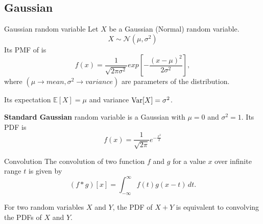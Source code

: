 \subsection{Gaussian}

\begin{fact}{Gaussian random variable}{}
  Let $X$ be a Gaussian (Normal) random variable.
  \begin{equation*}
      X \sim \mathcal{N}(\mu,\sigma^2)
  \end{equation*}
  Its PMF of is
  \begin{equation*}
    f(x)=\frac{1}{\sqrt{2\pi\sigma^2}}exp\left[-\frac{(x-\mu)^2}{2\sigma^2}\right],
  \end{equation*}
  where $(\mu\rightarrow mean,\sigma^2\rightarrow variance)$ are parameters of the distribution.

  Its expectation $\mathbb{E}[X]=\mu$ and variance $\mathrm{Var}[X]=\sigma^2$.

  \textbf{Standard Gaussian} random variable is a Gaussian with $\mu=0$ and $\sigma^2=1$. Its PDF is
  \begin{equation*}
    f(x)=\frac{1}{\sqrt{2\pi}}e^{-\frac{x^2}{2}}
  \end{equation*}
\end{fact}

\begin{fact}{Convolution}{}
  The convolution of two function $f$ and $g$ for a value $x$ over infinite range $t$ is given by
  \begin{equation*}
    (f*g)[x] = \int_{-\infty}^{\infty}f(t)g(x-t)\,dt.
  \end{equation*}
\end{fact}

For two random variables $X$ and $Y$, the PDF of $X+Y$ is equivalent to convolving the PDFs of $X$ and $Y$.
